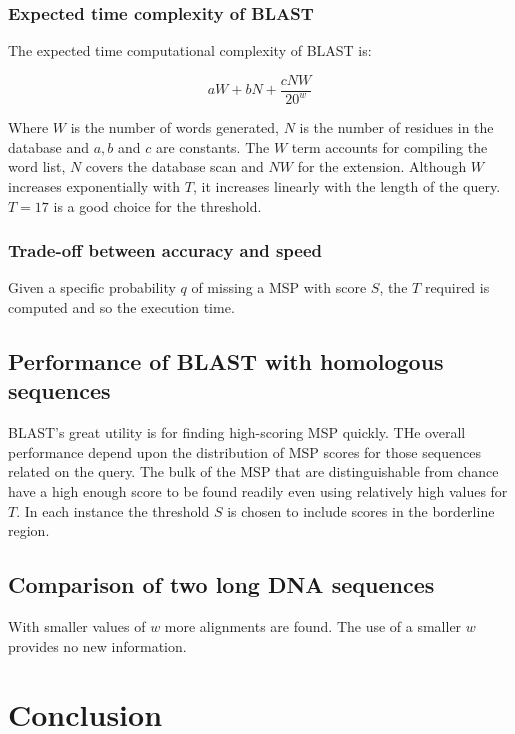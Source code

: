 		\subsubsection{Expected time complexity of BLAST}
		The expected time computational complexity of BLAST is:

		$$aW + bN + \frac{cNW}{20^w}$$

		Where $W$ is the number of words generated, $N$ is the number of residues in the database and $a, b$ and $c$ are constants.
		The $W$ term accounts for compiling the word list, $N$ covers the database scan and $NW$ for the extension.
		Although $W$ increases exponentially with $T$, it increases linearly with the length of the query.
		$T=17$ is a good choice for the threshold.

		\subsubsection{Trade-off between accuracy and speed}
		Given a specific probability $q$ of missing a MSP with score $S$, the $T$ required is computed and so the execution time.

	\subsection{Performance of BLAST with homologous sequences}
	BLAST's great utility is for finding high-scoring MSP quickly.
	THe overall performance depend upon the distribution of MSP scores for those sequences related on the query.
	The bulk of the MSP that are distinguishable from chance have a high enough score to be found readily even using relatively high values for $T$.
	In each instance the threshold $S$ is chosen to include scores in the borderline region.

	\subsection{Comparison of two long DNA sequences}
	With smaller values of $w$ more alignments are found.
	The use of a smaller $w$ provides no new information.

\section{Conclusion}
